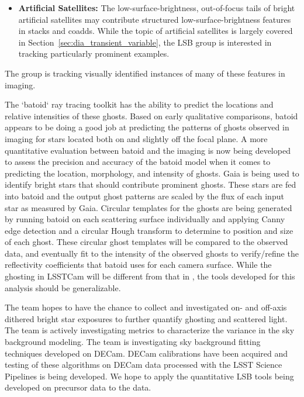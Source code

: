 \begin{itemize}
\item {\bf Artificial Satellites:} The low-surface-brightness, out-of-focus tails of bright artificial satellites may contribute structured low-surface-brightness features in stacks and coadds. While the topic of artificial satellites is largely covered in Section~\ref{sec:dia_transient_variable}, the LSB group is interested in tracking particularly prominent examples.

\end{itemize}

The group is tracking visually identified instances of many of these features in \ComCam imaging.

  The `batoid` ray tracing toolkit has the ability to predict the locations and relative intensities of these ghosts. Based on early qualitative comparisons, batoid appears to be doing a good job at predicting the patterns of ghosts observed in \ComCam imaging for stars located both on and slightly off the focal plane. A more quantitative evaluation between batoid and the \ComCam imaging is now being developed to assess the precision and accuracy of the batoid model when it comes to predicting the location, morphology, and intensity of ghosts. Gaia is being used to identify bright stars that should contribute prominent ghosts. These stars are fed into batoid and the output ghost patterns are scaled by the flux of each input star as measured by Gaia. Circular templates for the ghosts are being generated by running batoid on each scattering surface individually and applying Canny edge detection and a circular Hough transform to determine to position and size of each ghost. These circular ghost templates will be compared to the observed data, and eventually fit to the intensity of the observed ghosts to verify/refine the reflectivity coefficients that batoid uses for each camera surface. While the ghosting in LSSTCam will be different from that in \ComCam, the tools developed for this analysis should be generalizable.


The team hopes to have the chance to collect and investigated on- and off-axis dithered bright star exposures to further quantify ghosting and scattered light. The team is actively investigating metrics to characterize the variance in the sky background modeling. The team is investigating sky background fitting techniques developed on DECam. DECam calibrations have been acquired and testing of these algorithms on DECam data processed with the LSST Science Pipelines is being developed. We hope to apply the quantitative LSB tools being developed on precursor data to the \ComCam data.

